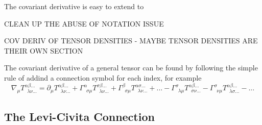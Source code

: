 The covariant derivative is easy to extend to 

CLEAN UP THE ABUSE OF NOTATION ISSUE 

COV DERIV OF TENSOR DENSITIES - MAYBE TENSOR DENSITIES ARE THEIR OWN SECTION

The covariant derivative of a general tensor can be found by following the simple rule of addind a connection symbol for each index, for example
\begin{equation}
\nabla_\mu T^{\alpha\beta ...}_{\,\,\,\lambda\nu ...} = \partial_\mu T^{\alpha\beta ...}_{\,\,\,\lambda\nu ...} 
+ \Gamma^{\alpha}_{\,\,\,\sigma \mu} T^{\sigma\beta ...}_{\,\,\,\lambda\nu ...} + \Gamma^{\beta}_{\,\,\,\sigma\mu} T^{\alpha\sigma ...}_{\,\,\,\lambda\nu ...} + ...
- \Gamma^{\sigma}_{\,\,\,\lambda\mu} T^{\alpha\beta ...}_{\,\,\,\sigma\nu ...} - \Gamma^{\sigma}_{\,\,\,\nu\mu} T^{\alpha\beta ...}_{\,\,\,\lambda\sigma ...} - ...
\end{equation}



\subsection{The Levi-Civita Connection}

